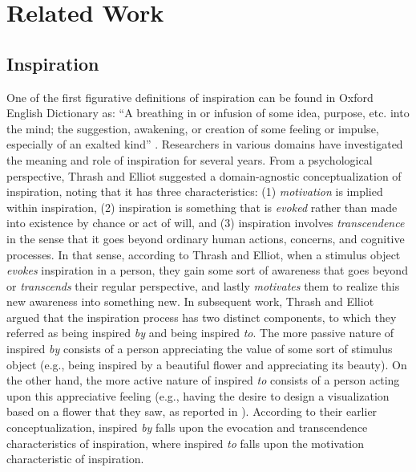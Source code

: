 \section{Related Work}
\label{background}
\subsection{Inspiration}
One of the first figurative definitions of inspiration can be found in Oxford English Dictionary as: ``A breathing in or infusion of some idea, purpose, etc. into the mind; the suggestion, awakening, or creation of some feeling or impulse, especially of an exalted kind'' \cite[p. 1036]{simpson_oxford_1989}. Researchers in various domains have investigated the meaning and role of inspiration for several years. From a psychological perspective, Thrash and Elliot \cite{thrash_inspiration_2003} suggested a domain-agnostic conceptualization of inspiration, noting that it has three characteristics: (1) \textit{motivation} is implied within inspiration, (2) inspiration is something that is \textit{evoked} rather than made into existence by chance or act of will, and (3) inspiration involves \textit{transcendence} in the sense that it goes beyond ordinary human actions, concerns, and cognitive processes. In that sense, according to Thrash and Elliot, when a stimulus object \textit{evokes} inspiration in a person, they gain some sort of awareness that goes beyond or \textit{transcends} their regular perspective, and lastly \textit{motivates} them to realize this new awareness into something new. In subsequent work, Thrash and Elliot \cite{thrash_inspiration_2004} argued that the inspiration process has two distinct components, to which they referred as being inspired \textit{by} and being inspired \textit{to}. The more passive nature of inspired \textit{by} consists of a person appreciating the value of some sort of stimulus object (e.g., being inspired by a beautiful flower and appreciating its beauty). On the other hand, the more active nature of inspired \textit{to} consists of a person acting upon this appreciative feeling (e.g., having the desire to design a visualization based on a flower that they saw, as reported in \cite{parsons_fixation_2021}). According to their earlier conceptualization, inspired \textit{by} falls upon the evocation and transcendence characteristics of inspiration, where inspired \textit{to} falls upon the motivation characteristic of inspiration. 

